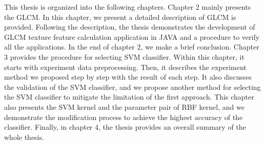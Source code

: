 This thesis is organized into the following chapters. Chapter 2 mainly presents the GLCM. In this chapter, we present a detailed description of GLCM is provided. Following the description, the thesis demonstrates the development of GLCM texture feature calculation application in JAVA and a procedure to verify all the applications. In the end of chapter 2, we make a brief conclusion. Chapter 3 provides the procedure for selecting SVM classifier. Within this chapter, it starts with experiment data preprocessing. Then, it describes the experiment method we proposed step by step with the result of each step. It also discusses the validation of the SVM classifier, and we propose another method for selecting the SVM classifier to mitigate the limitation of the first approach. This chapter also presents the SVM kernel and the parameter pair of RBF kernel, and we demonstrate the modification process to achieve the highest accuracy of the classifier. Finally, in chapter 4, the thesis provides an overall summary of the whole thesis.      